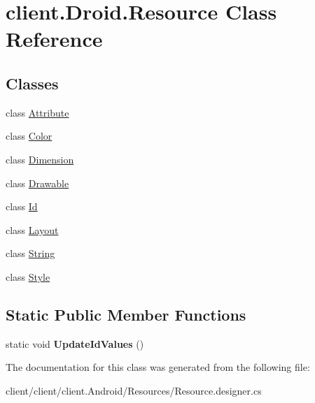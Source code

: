 \hypertarget{classclient_1_1Droid_1_1Resource}{\section{client.\-Droid.\-Resource Class Reference}
\label{classclient_1_1Droid_1_1Resource}
}
\subsection*{Classes}
\begin{DoxyCompactItemize}
\item 
class \hyperlink{classclient_1_1Droid_1_1Resource_1_1Attribute}{Attribute}
\item 
class \hyperlink{classclient_1_1Droid_1_1Resource_1_1Color}{Color}
\item 
class \hyperlink{classclient_1_1Droid_1_1Resource_1_1Dimension}{Dimension}
\item 
class \hyperlink{classclient_1_1Droid_1_1Resource_1_1Drawable}{Drawable}
\item 
class \hyperlink{classclient_1_1Droid_1_1Resource_1_1Id}{Id}
\item 
class \hyperlink{classclient_1_1Droid_1_1Resource_1_1Layout}{Layout}
\item 
class \hyperlink{classclient_1_1Droid_1_1Resource_1_1String}{String}
\item 
class \hyperlink{classclient_1_1Droid_1_1Resource_1_1Style}{Style}
\end{DoxyCompactItemize}
\subsection*{Static Public Member Functions}
\begin{DoxyCompactItemize}
\item 
\hypertarget{classclient_1_1Droid_1_1Resource_ae7657037f7902ac90ac159df5d2b0de0}{static void {\bfseries Update\-Id\-Values} ()}\label{classclient_1_1Droid_1_1Resource_ae7657037f7902ac90ac159df5d2b0de0}

\end{DoxyCompactItemize}


The documentation for this class was generated from the following file\-:\begin{DoxyCompactItemize}
\item 
client/client/client.\-Android/\-Resources/Resource.\-designer.\-cs\end{DoxyCompactItemize}
